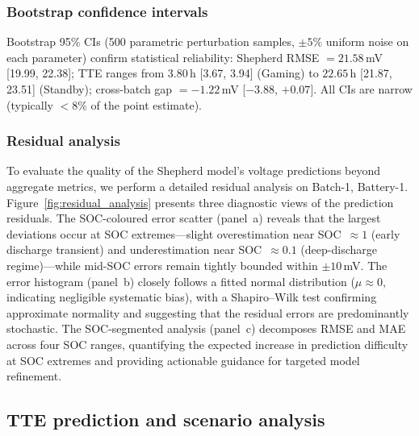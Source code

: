 \documentclass[5p,times,number]{elsarticle}
\newcommand{\figref}[1]{\hyperref[#1]{\textup{Figure~\ref*{#1}}}}
\def\figref#1{Figure~\ref{#1}}
\begin{document}
\subsubsection{Bootstrap confidence intervals}\label{sec:bootstrap}
Bootstrap 95\% CIs (500 parametric perturbation samples, $\pm5\%$ uniform noise on each parameter) confirm statistical reliability: Shepherd RMSE $= 21.58$\,mV [19.99, 22.38]; TTE ranges from $3.80$\,h [3.67, 3.94] (Gaming) to $22.65$\,h [21.87, 23.51] (Standby); cross-batch gap $= -1.22$\,mV [$-3.88$, $+0.07$].
All CIs are narrow (typically $< 8\%$ of the point estimate).

\subsubsection{Residual analysis}\label{sec:residual}
To evaluate the quality of the Shepherd model's voltage predictions beyond aggregate metrics, we perform a detailed residual analysis on Batch-1, Battery-1.
\figref{fig:residual_analysis} presents three diagnostic views of the prediction residuals.
The SOC-coloured error scatter (panel~a) reveals that the largest deviations occur at SOC extremes---slight overestimation near SOC~$\approx 1$ (early discharge transient) and underestimation near SOC~$\approx 0.1$ (deep-discharge regime)---while mid-SOC errors remain tightly bounded within $\pm 10$\,mV.
The error histogram (panel~b) closely follows a fitted normal distribution ($\mu \approx 0$, indicating negligible systematic bias), with a Shapiro--Wilk test confirming approximate normality and suggesting that the residual errors are predominantly stochastic.
The SOC-segmented analysis (panel~c) decomposes RMSE and MAE across four SOC ranges, quantifying the expected increase in prediction difficulty at SOC extremes and providing actionable guidance for targeted model refinement.

\subsection{TTE prediction and scenario analysis}\label{sec:tte_analysis}
\end{document}
